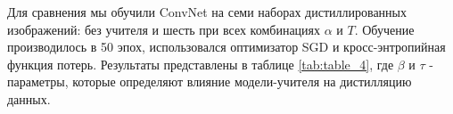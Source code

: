 \documentclass[12pt]{article}
\begin{document}
Для сравнения мы обучили ConvNet на семи наборах дистиллированных изображений: без учителя и шесть при всех комбинациях $\alpha$ и $T$. Обучение производилось в 50 эпох, использовался оптимизатор SGD и кросс-энтропийная функция потерь. Результаты представлены в таблице \ref{tab:table_4}, где $\beta$ и $\tau$ - параметры, которые определяют влияние модели-учителя на дистилляцию данных.




\end{document}
